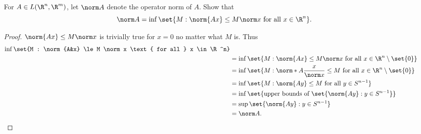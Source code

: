 \documentclass[12pt]{article}
\begin{document}
\begin{problem}
    For $A \in L(\R^n, \R^m)$, let $\norm A$ denote the operator norm of $A$.
    Show that \[
        \norm A = \inf\set{M : \norm{Ax} \le M \norm x
                    \text{ for all } x \in \R^n}.
    \]
\end{problem}
\begin{proof}
    $\norm{Ax} \le M \norm x$ is trivially true for $x = 0$ no matter
    what $M$ is.
    Thus \begin{align*}
        \inf\set{M : \norm{A&x} \le M \norm x
                    \text{ for all } x \in \R^n} \\
        &= \inf\set{M : \norm{Ax} \le M \norm x
                    \text{ for all } x \in \R^n \setminus \set{0}} \\
        &= \inf\set{M : \norm*{A\frac{x}{\norm x}} \le M
                    \text{ for all } x \in \R^n \setminus \set{0}} \\
        &= \inf\set{M : \norm{Ay} \le M \text{ for all } y \in S^{n-1}} \\
        &= \inf\set{\text{upper bounds of } \set{\norm{Ay} : y \in S^{n-1}}} \\
        &= \sup\set{\norm{Ay} : y \in S^{n-1}} \\
        &= \norm A. \qedhere
    \end{align*}
\end{proof}
\end{document}
